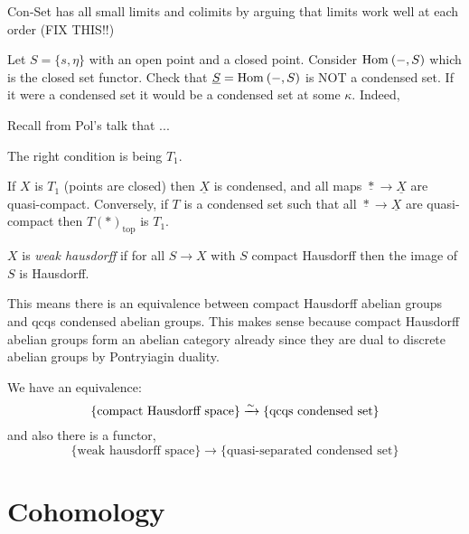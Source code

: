 \documentclass[12pt]{article}
\begin{document}
\begin{rmk}
Con-Set has all small limits and colimits by arguing that limits work well at each order (FIX THIS!!)
\end{rmk}

\begin{example}
Let $S = \{ s, \eta \}$ with an open point and a closed point. Consider $\mathrm{Hom}_{} \left( -, S \right)$ which is the closed set functor. Check that $\underline{S} = \mathrm{Hom}_{} \left( -, S \right)$ is NOT a condensed set. If it were a condensed set it would be a condensed set at some $\kappa$. Indeed, 
\end{example}


Recall from Pol's talk that ... 


The right condition is being $T_1$.

\begin{prop}
If $X$ is $T_1$ (points are closed) then $\underline{X}$ is condensed, and all maps $\underline{*} \to \underline{X}$ are quasi-compact. Conversely, if $T$ is a condensed set such that all $\underline{*} \to \underline{X}$ are quasi-compact then $T(*)_{\text{top}}$ is $T_1$.
\end{prop}

\begin{defn}
$X$ is \textit{weak hausdorff} if for all $S \to X$ with $S$ compact Hausdorff then the image of $S$ is Hausdorff. 
\end{defn}

\begin{rmk}
This means there is an equivalence between compact Hausdorff abelian groups and qcqs condensed abelian groups. This makes sense because compact Hausdorff abelian groups form an abelian category already since they are dual to discrete abelian groups by Pontryiagin duality. 
\end{rmk}

\begin{theorem}
We have an equivalence:
\[ \{ \text{compact Hausdorff space} \} \xrightarrow{\sim} \{ \text{qcqs condensed set} \} \]
and also there is a functor,
\[ \{ \text{weak hausdorff space} \} \to \{ \text{quasi-separated condensed set} \} \]
\end{theorem}

\section{Cohomology}
\end{document}
